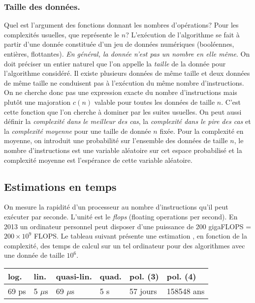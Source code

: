 \subsubsection{Taille des données.}
Quel est l'argument des fonctions donnant les nombres d'opérations? Pour les complexités usuelles, que représente le $n$?\newline
L'exécution de l'algorithme se fait à partir d'une donnée constituée d'un jeu de données numériques (booléennes, entières, flottantes). \emph{En général, la donnée n'est pas un nombre en elle même}.\newline
On doit préciser un entier naturel que l'on appelle la \emph{taille} de la donnée pour l'algorithme considéré. Il existe plusieurs données de même taille et deux données de même taille ne conduisent pas à l'exécution du même nombre d'instructions. On ne cherche donc pas une expression exacte du nombre d'instructions mais plutôt une majoration $c(n)$ valable pour toutes les données de taille $n$. C'est cette fonction que l'on cherche à dominer par les suites usuelles. \newline
On peut aussi définir la \emph{complexité dans le meilleur des cas},  la \emph{complexité dans le pire des cas} et la \emph{complexité moyenne} pour une taille de donnée $n$ fixée.\newline
Pour la complexité en moyenne, on introduit une probabilité sur l'ensemble des données de taille $n$, le nombre d'instructions est une variable aléatoire sur cet espace probabilisé et la complexité moyenne est l'espérance de cette variable aléatoire.

\subsection{Estimations en temps}
On mesure la rapidité d'un processeur au nombre d'instructions qu'il peut exécuter par seconde. L'unité est le \emph{flops} (floating operations per second).\newline
En 2013 un ordinateur personnel peut disposer d'une puissance de 200 gigaFLOPS = $200\times 10^{9}$ FLOPS. Le tableau suivant présente une estimation , en fonction de la complexité, des temps de calcul sur un tel ordinateur pour des algorithmes avec une donnée de taille $10^{6}$.
\begin{center}
\renewcommand{\arraystretch}{1.5}
\begin{tabular}{|l|l|l|l|l|l|} \hline
log. & lin. & quasi-lin. & quad. & pol. (3) & pol. (4)\\ \hline
69 ps & 5 $\mu$s & 69 $\mu$s & 5 s & 57 jours & 158548 ans \\ \hline
\end{tabular}
\end{center}


